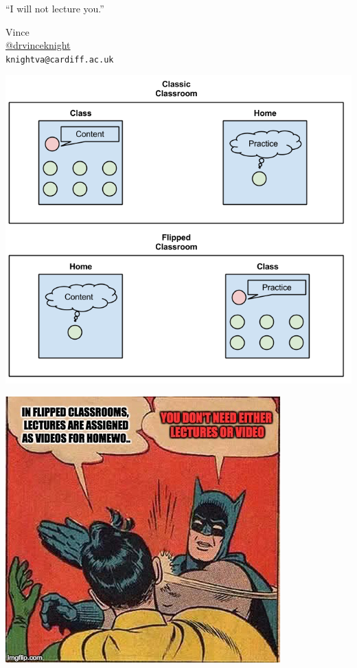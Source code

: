 \documentclass{beamer}
\begin{document}
    \begin{frame}
        \begin{center}
            \Large

            ``I will not lecture you.''

            \normalsize
            \vspace{1cm}
            Vince\\
            \href{https://twitter.com/drvinceknight}{@drvinceknight}\\
            \texttt{knightva@cardiff.ac.uk}
        \end{center}


    \end{frame}

    \begin{frame}
        \begin{center}
            \includegraphics[width=.8\textwidth]{./static/flipped_class.png}
        \end{center}
    \end{frame}

    \begin{frame}
		\begin{center}
			\includegraphics[width=.6\textwidth]{./static/time_for_this_again.png}
		\end{center}
	\end{frame}
\end{document}
